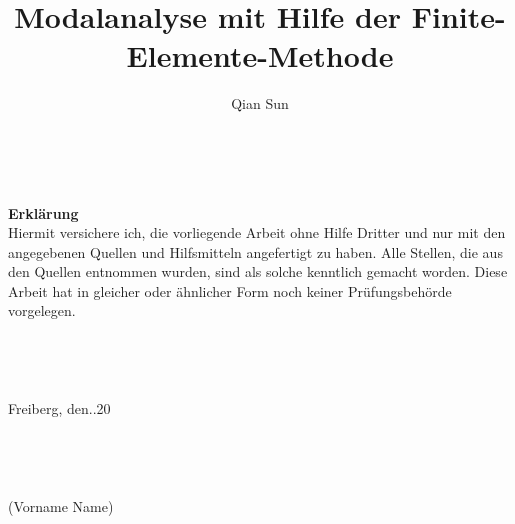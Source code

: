 \documentclass[a4paper,10pt,twoside]{article}
\title{Modalanalyse mit Hilfe der Finite-Elemente-Methode}
\author{Qian Sun}
\numberwithin{equation}{section} %
\numberwithin{figure}{section}   %
\numberwithin{table}{section}    %
\begin{document}
	
	\fancyhead[LO,RE]{}%
	
	\begin{titlepage}
		
	
	
	\newpage
	\pagestyle{empty}
		\ \\
		\newpage
	\pagestyle{fancy}
	
	{\LARGE \textbf{Erklärung}}\\
	
	Hiermit versichere ich, die vorliegende Arbeit ohne Hilfe Dritter und nur mit den angegebenen
	Quellen und Hilfsmitteln angefertigt zu haben. Alle Stellen, die aus den Quellen entnommen
	wurden, sind als solche kenntlich gemacht worden. Diese Arbeit hat in gleicher oder ähnlicher
	Form noch keiner Prüfungsbehörde vorgelegen.\\
	\\
	\\
	\\
	\\
	Freiberg, den\underline{\quad \quad}.\underline{\quad \quad}.20\underline{\quad \quad}\\
	\\
	\\
	\\
	\underline{\qquad \qquad \qquad \qquad \qquad \quad} \\
	(Vorname Name)


	\newpage
	\pagestyle{empty}
	\ \\
	\newpage
	
	
	
	\newpage
	\pagestyle{empty}
	\ \\
	\newpage

	\end{titlepage}
	
	\newpage
	
	
    \pagestyle{fancy}
	\fancyhead[LO,RE]{\thepage}%
	
\end{document}
